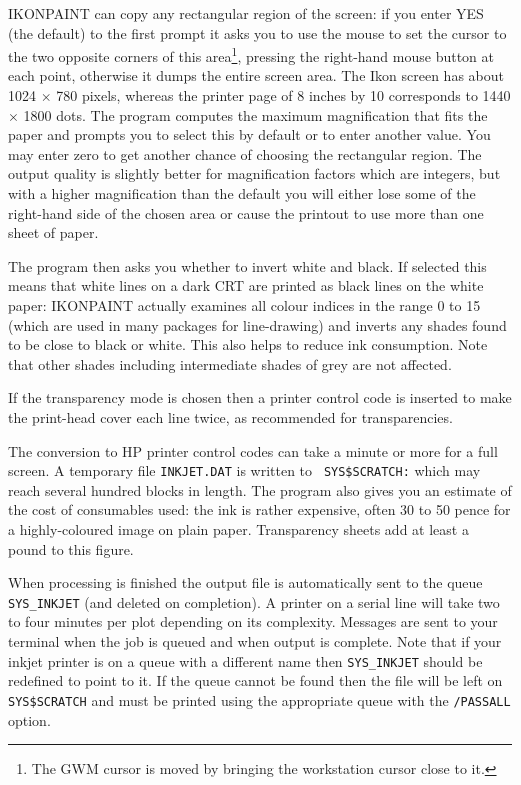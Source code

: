 IKONPAINT can copy any rectangular region of the screen: if you enter
YES (the default) to the first prompt it asks you to use the mouse to
set the cursor to the two opposite corners of this area\footnote{The GWM
cursor is moved by bringing the workstation cursor close to it.},
pressing the right-hand mouse button at each point, otherwise it dumps
the entire screen area.
The Ikon screen has about 1024 $\times$ 780 pixels, whereas
the printer page of 8 inches by 10 corresponds to 1440 $\times$ 1800
dots. The program computes the maximum magnification that fits the paper
and prompts you to select this by default or to enter another value. You
may enter zero to get another chance of choosing the rectangular region.
The output quality is slightly better for magnification factors which
are integers, but with a higher magnification than the default you will
either lose some of the right-hand side of the chosen area or cause the
printout to use more than one sheet of paper. 

The program then asks you whether to invert white and black.  If selected
this means that white lines on a dark CRT are printed as black lines on
the white paper: IKONPAINT actually examines all colour indices in the
range 0 to 15 (which are used in many packages for line-drawing) and
inverts any shades found to be close to black or white. This also helps
to reduce ink consumption.  Note that other shades including
intermediate shades of grey are not affected. 

If the transparency mode is chosen then a printer control code is
inserted to make the print-head cover each line twice, as recommended
for transparencies. 

The conversion to HP printer control codes can take a minute or more for
a full screen. A temporary file {\tt INKJET.DAT} is written to {\tt
SYS\$SCRATCH:} which may reach several hundred blocks in length. The
program also gives you an estimate of the cost of consumables used: the
ink is rather expensive, often 30 to 50 pence for a highly-coloured
image on plain paper.  Transparency sheets add at least a pound to this
figure. 

When processing is finished the output file is automatically sent to the
queue {\tt SYS\_INKJET} (and deleted on completion).  A printer on a
serial line will take two to four minutes per plot depending on its
complexity. Messages are sent to your terminal when the job is queued
and when output is complete.  Note that if your inkjet printer is on a
queue with a different name then {\tt SYS\_INKJET} should be redefined
to point to it.   If the queue cannot be found then the file will be
left on {\tt SYS\$SCRATCH} and must be printed using the appropriate
queue with the {\tt /PASSALL} option. 

